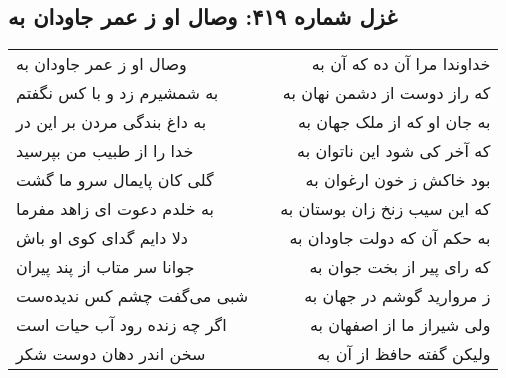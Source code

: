 \begin{center}
\section*{غزل شماره ۴۱۹: وصال او ز عمر جاودان به}
\label{sec:sh419}
\begin{longtable}{l p{0.5cm} r}
وصال او ز عمر جاودان به
&&
خداوندا مرا آن ده که آن به
\\
به شمشیرم زد و با کس نگفتم
&&
که راز دوست از دشمن نهان به
\\
به داغ بندگی مردن بر این در
&&
به جان او که از ملک جهان به
\\
خدا را از طبیب من بپرسید
&&
که آخر کی شود این ناتوان به
\\
گلی کان پایمال سرو ما گشت
&&
بود خاکش ز خون ارغوان به
\\
به خلدم دعوت ای زاهد مفرما
&&
که این سیب زنخ زان بوستان به
\\
دلا دایم گدای کوی او باش
&&
به حکم آن که دولت جاودان به
\\
جوانا سر متاب از پند پیران
&&
که رای پیر از بخت جوان به
\\
شبی می‌گفت چشم کس ندیده‌ست
&&
ز مروارید گوشم در جهان به
\\
اگر چه زنده رود آب حیات است
&&
ولی شیراز ما از اصفهان به
\\
سخن اندر دهان دوست شکر
&&
ولیکن گفته حافظ از آن به
\\
\end{longtable}
\end{center}
